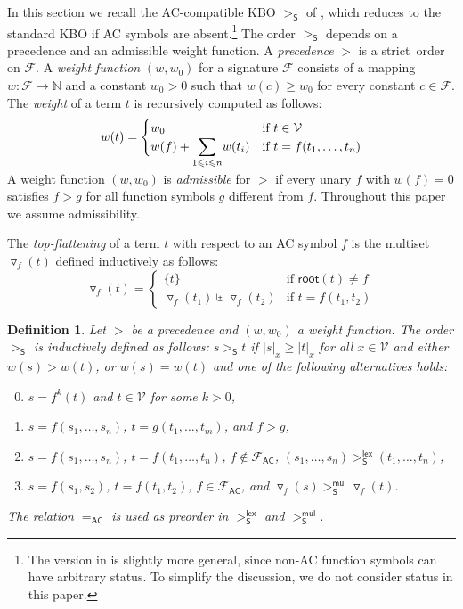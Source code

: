 \documentclass{tlp}
\newtheorem{definition}[theorem]{Definition}
\newcommand{\tf}[1]{{\triangledown_{\!#1}}}
\newcommand{\m}[1]{\mathsf{#1}}
\newcommand{\mc}[1]{\mathcal{#1}}
\newcommand{\mr}[1]{\mathrm{#1}}
\newcommand{\rt}{\m{root}}
\newcommand{\lex}{\m{lex}}
\newcommand{\mul}{\m{mul}}
\newcommand{\FF}{\mc{F}}
\newcommand{\VV}{\mc{V}}
\newcommand{\AC}{\mr{\m{AC}}}
\newcommand{\steinbach}{\mr{\m{S}}}
\newcommand{\seq}[2][n]{{#2_1},\dots,{#2_{#1}}}
\newcommand{\Nat}{\mathbb{N}}
\newcommand{\proper}{proper}
\renewcommand{\proper}{strict}
\begin{document}
In this section we recall the AC-compatible KBO $>_\steinbach$ of
, which reduces to the standard KBO if AC symbols are
absent.\footnote{The version in \cite{S90} is slightly more general, since non-AC
function symbols can have arbitrary status. To simplify the discussion, we
do not consider status in this paper.}
The order $>_\steinbach$ depends on a precedence
and an admissible weight function.
A \emph{precedence} $>$ is a \proper\ order on $\FF$.
A \emph{weight function} $(w,w_0)$ for a signature $\FF$ consists of
a mapping $w\colon \FF \to \Nat$ and a constant $w_0 > 0$ such that 
$w(c) \geqslant w_0$ for every constant $c \in \FF$.
The \emph{weight} of a term $t$ is recursively computed as follows:
\[
w(t) = 
\begin{cases}
w_0 & \text{if $t \in \VV$} \\
\displaystyle w(f) + \smash[b]{\sum_{1 \leqslant i \leqslant n}} w(t_i) &
\text{if $t = f(\seq{t})$}
\end{cases}
\]

\bigskip

\noindent
A weight function $(w,w_0)$ is \emph{admissible} for $>$ if 
every unary $f$ with $w(f) = 0$ satisfies $f > g$ for all
function symbols $g$ different from $f$.
Throughout this paper we assume admissibility.



The \emph{top\hyp flattening} \cite{R02}
of a term $t$ with respect to an AC symbol $f$
is the multiset $\tf{f}(t)$ defined inductively as follows:
\[
\tf{f}(t) =
\begin{cases}
\{ t \} & \text{if $\rt(t) \neq f$} \\
\tf{f}(t_1) \uplus \tf{f}(t_2) & \text{if $t = f(t_1,t_2)$}
\end{cases}
\]

\begin{definition}
\label{def:Steinbach}
Let $>$ be a precedence and $(w,w_0)$ a weight function.
The order $>_\steinbach$ is inductively defined
as follows: $s >_\steinbach t$ if
$|s|_x \geqslant |t|_x$ for all $x \in \VV$ and either $w(s) > w(t)$, or
$w(s) = w(t)$ and one of the following alternatives holds:
\begin{enumerate}
\setcounter{enumi}{-1}
\item
$s = f^k(t)$ and $t \in \VV$ for some $k > 0$,
\smallskip
\item
$s = f(\seq{s})$, $t = g(\seq[m]{t})$, and $f > g$,
\smallskip
\item
$s = f(\seq{s})$, $t = f(\seq{t})$, $f \notin \FF_\AC$,
$(\seq{s}) >_\steinbach^\lex (\seq{t})$,
\smallskip
\item
$s = f(s_1,s_2)$, $t = f(t_1,t_2)$, $f \in \FF_\AC$,
and $\tf{f}(s) >_\steinbach^\mul \tf{f}(t)$.
\end{enumerate}
\smallskip
The relation $=_\AC$ is used as preorder in
$>_\steinbach^\lex$ and $>_\steinbach^\mul$.
\end{definition}
\end{document}

